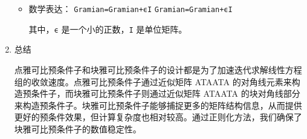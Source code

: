 \documentclass{ctexart}
\begin{document}
\begin{enumerate}
\begin{itemize}
		      \item 数学表达：
		            \texttt{Gramian=Gramian+ϵI}
		            \texttt{Gramian=Gramian+ϵI}

		            其中，\texttt{ϵ} 是一个小的正数，\texttt{I} 是单位矩阵。
	      \end{itemize}

	\item 总结

	      点雅可比预条件子和块雅可比预条件子的设计都是为了加速迭代求解线性方程组的收敛速度。点雅可比预条件子通过近似矩阵 ATAATA 的对角线元素来构造预条件子，而块雅可比预条件子则通过近似矩阵 ATAATA 的块对角线部分来构造预条件子。块雅可比预条件子能够捕捉更多的矩阵结构信息，从而提供更好的预条件效果，但计算复杂度也相对较高。通过正则化方法，我们确保了块雅可比预条件子的数值稳定性。

\end{enumerate}


\end{document}
